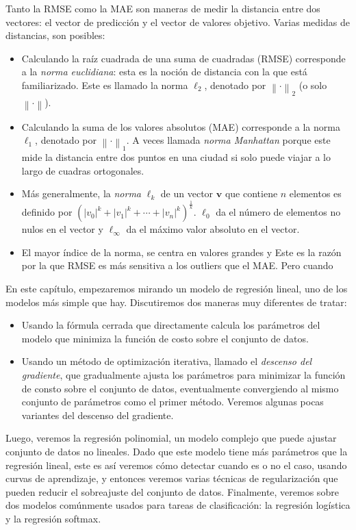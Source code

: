 Tanto la RMSE como la MAE son maneras de medir la distancia entre dos vectores: el vector de predicción y el vector de valores objetivo. Varias medidas de distancias, son posibles:
\begin{itemize}
	\item Calculando la raíz cuadrada de una suma de cuadradas (RMSE) corresponde a la \emph{norma euclidiana}: esta es la noción de distancia con la que está familiarizado. Este es llamado la norma $\ell_{2}$, denotado por $\left\|\cdot\right\|_{2}$ (o solo $\left\|\cdot\right \|$).
	\item Calculando la suma de los valores absolutos (MAE) corresponde a la norma $\ell_{1}$, denotado por $\left\|\cdot\right\|_{1}$. A veces llamada \emph{norma Manhattan} porque este mide la distancia entre dos puntos en una ciudad si solo puede viajar a lo largo de cuadras ortogonales.
	\item Más generalmente, la \emph{norma} $\ell_{k}$ de un vector $\bm{v}$ que contiene $n$ elementos es definido por ${\left({\left|v_{0}\right|}^{k}+{\left|v_{1}\right|}^{k}+\cdots+{\left|v_{n}\right|}^{k}\right)}^{\frac{1}{k}}$. $\ell_{0}$ da el número de elementos no nulos en el vector y $\ell_{\infty}$ da el máximo valor absoluto en el vector.
	\item El mayor índice de la norma, %
	se centra en valores grandes y %
	Este es la razón por la que RMSE es más sensitiva a los outliers que el MAE. Pero cuando
\end{itemize}

En este capítulo, empezaremos mirando un modelo de regresión lineal, uno de los modelos más simple que hay. Discutiremos dos maneras muy diferentes de tratar:
\begin{itemize}
	\item Usando la fórmula cerrada que directamente calcula los parámetros del modelo que minimiza la función de costo sobre el conjunto de datos.
	\item Usando un método de optimización iterativa, llamado el \emph{descenso del gradiente}, que gradualmente ajusta los parámetros para minimizar la función de consto sobre el conjunto de datos, eventualmente convergiendo al mismo conjunto de parámetros como el primer método. Veremos algunas pocas variantes del descenso del gradiente.
\end{itemize}
Luego, veremos la regresión polinomial, un modelo complejo que puede ajustar conjunto de datos no lineales. Dado que este modelo tiene más parámetros que la regresión lineal, este es %
así veremos cómo detectar cuando es o no el caso, usando curvas de aprendizaje, y entonces veremos varias técnicas de regularización que pueden reducir el sobreajuste del conjunto de datos. Finalmente, veremos sobre dos modelos comúnmente usados para tareas de clasificación: la regresión logística y la regresión softmax.

